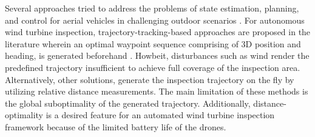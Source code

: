 Several approaches tried to address the problems of state estimation, planning, and control for aerial vehicles in challenging outdoor scenarios \cite{jakob,micha,aruco}. For autonomous wind turbine inspection, trajectory-tracking-based approaches are proposed in the literature wherein an optimal waypoint sequence comprising of 3D position and heading, is generated beforehand \cite{CPP,3dmodeling,SIP}. Howbeit, disturbances such as wind render the predefined trajectory insufficient to achieve full coverage of the inspection area.
Alternatively, other solutions, \cite{mohit,lidar} generate the inspection trajectory on the fly by utilizing relative distance measurements. The main limitation of these methods is the global suboptimality of the generated trajectory. Additionally, distance-optimality is a desired feature for an automated wind turbine inspection framework because of the limited battery life of the drones.

